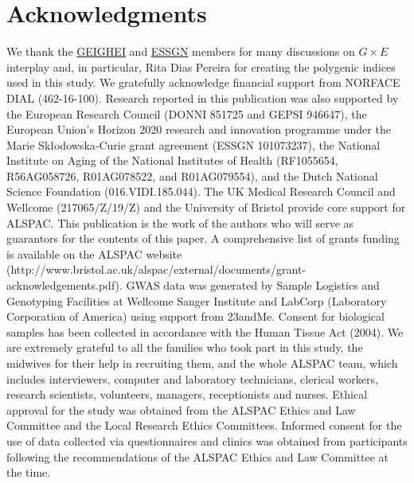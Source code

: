 \documentclass[12pt,a4paper]{article}
\begin{document}
\section*{Acknowledgments}
We thank the \href{https://gene-environment.com/}{GEIGHEI} and \href{https://essgn.org/}{ESSGN} members for many discussions on $G \times E$ interplay and, in particular, Rita Dias Pereira for creating the polygenic indices used in this study. We gratefully acknowledge financial support from NORFACE DIAL (462-16-100). Research reported in this publication was also supported by the European Research Council (DONNI 851725 and GEPSI 946647), the European Union’s Horizon 2020 research and innovation programme under the Marie Skłodowska-Curie grant agreement (ESSGN 101073237), the National Institute on Aging of the National Institutes of Health (RF1055654, R56AG058726, R01AG078522, and R01AG079554), and the Dutch National Science Foundation (016.VIDI.185.044).  The UK Medical Research Council and Wellcome (217065/Z/19/Z) and the University of Bristol provide core support for ALSPAC. This publication is the work of the authors who will serve as guarantors for the contents of this paper. A comprehensive list of grants funding is available on the ALSPAC website (http://www.bristol.ac.uk/alspac/external/documents/grant-acknowledgements.pdf). GWAS data was generated by Sample Logistics and Genotyping Facilities at Wellcome Sanger Institute and LabCorp (Laboratory Corporation of America) using support from 23andMe. Consent for biological samples has been collected in accordance with the Human Tissue Act (2004). We are extremely grateful to all the families who took part in this study, the midwives for their help in recruiting them, and the whole ALSPAC team, which includes interviewers, computer and laboratory technicians, clerical workers, research scientists, volunteers, managers, receptionists and nurses. Ethical approval for the study was obtained from the ALSPAC Ethics and Law Committee and the Local Research Ethics Committees. Informed consent for the use of data collected via questionnaires and clinics was obtained from participants following the recommendations of the ALSPAC Ethics and Law Committee at the time.
\clearpage
\appendix
\end{document}
